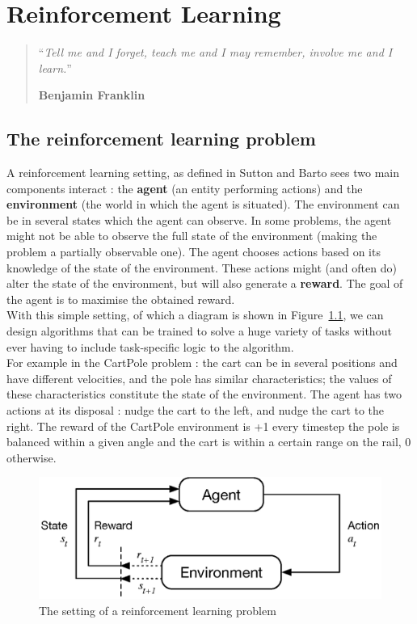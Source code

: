 \chapter{Reinforcement Learning}
\begin{quotation}
\noindent ``\emph{Tell me and I forget, teach me and I may remember, involve me
	and I learn.}''
\begin{flushright}\textbf{Benjamin Franklin}\end{flushright}
\end{quotation}

\vspace*{0.5cm}


\section{The reinforcement learning problem}
A reinforcement learning setting, as defined in Sutton and Barto \cite{suttonbarto}
sees two main components interact : the
\textbf{agent} (an entity performing actions) and the \textbf{environment}
(the world in which the agent is situated). 
The environment can be in several states which the agent
can observe. In some problems, the agent might not be able to observe the
full state of the environment (making the problem a partially observable one).  
The agent chooses actions based on its knowledge of the state of the
environment. These actions might (and often do) alter the state of the
environment, but will also generate a \textbf{reward}.  The
goal of the agent is to maximise the obtained reward.\\

With this simple setting, of which a diagram is shown in Figure~\ref{fig:rl},
we can design algorithms that can be trained to solve a huge variety of tasks
without ever having to include task-specific logic to the algorithm.\\

For example in the CartPole problem : the cart can be in several 
positions and have different velocities, and the pole has similar 
characteristics; the values of these characteristics constitute the state
of the environment. The agent has two actions at its disposal : nudge
the cart to the left, and nudge the cart to the right. 
The reward of the CartPole environment is +1 every timestep the pole is balanced
within a given angle 
and the cart is within a certain range on the rail, 0 otherwise.


\begin{figure}[]
	\centering
	\includegraphics[width=0.65\linewidth]{fig/rl.eps}
	\caption{The setting of a reinforcement learning problem 
		\cite{suttonbarto}}
	\label{fig:rl}
\end{figure}

